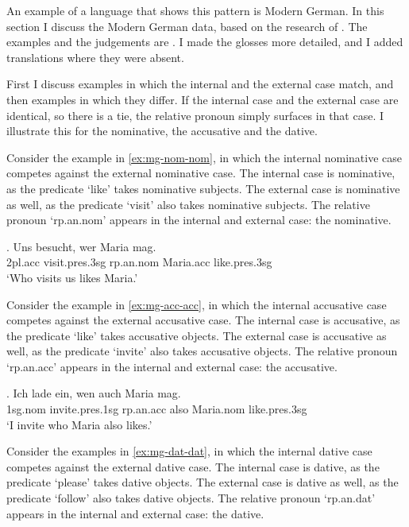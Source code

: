 An example of a language that shows this pattern is Modern German. In this section I discuss the Modern German data, based on the research of \citet{vogel2001}. The examples and the judgements are . I made the glosses more detailed, and I added translations where they were absent.

First I discuss examples in which the internal and the external case match, and then examples in which they differ. If the internal case and the external case are identical, so there is a tie, the relative pronoun simply surfaces in that case. I illustrate this for the nominative, the accusative and the dative.

Consider the example in \ref{ex:mg-nom-nom}, in which the internal nominative case competes against the external nominative case.
The internal case is nominative, as the predicate  `like' takes nominative subjects.
The external case is nominative as well, as the predicate  `visit' also takes nominative subjects.
The relative pronoun  `\ac{rp}.\ac{an}.\ac{nom}' appears in the internal and external case: the nominative.

\exg. Uns besucht, wer Maria mag.\\
 2\ac{pl}.\ac{acc} visit.\ac{pres}.3\ac{sg}\scsub{[nom]} \ac{rp}.\ac{an}.\ac{nom} Maria.\ac{acc} like.\ac{pres}.3\ac{sg}\scsub{[nom]}\\
 `Who visits us likes Maria.' \label{ex:mg-nom-nom}

Consider the example in \ref{ex:mg-acc-acc}, in which the internal accusative case competes against the external accusative case.
The internal case is accusative, as the predicate  `like' takes accusative objects.
The external case is accusative as well, as the predicate  `invite' also takes accusative objects.
The relative pronoun  `\ac{rp}.\ac{an}.\ac{acc}' appears in the internal and external case: the accusative.

\exg. Ich {lade ein}, wen auch Maria mag.\\
 1\ac{sg}.\ac{nom} invite.\ac{pres}.1\ac{sg}\scsub{[acc]} \ac{rp}.\ac{an}.\ac{acc} also Maria.\ac{nom} like.\ac{pres}.3\ac{sg}\scsub{[acc]}\\
 `I invite who Maria also likes.' \label{ex:mg-acc-acc}

Consider the examples in \ref{ex:mg-dat-dat}, in which the internal dative case competes against the external dative case.
The internal case is dative, as the predicate  `please' takes dative objects.
The external case is dative as well, as the predicate  `follow' also takes dative objects.
The relative pronoun  `\ac{rp}.\ac{an}.\ac{dat}' appears in the internal and external case: the dative.

